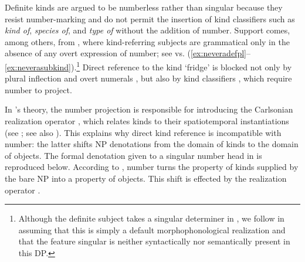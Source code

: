 \documentclass[output=paper]{langscibook}
\begin{document}
Definite kinds are argued to be numberless rather than singular because they resist number-marking and do not permit the insertion of kind classifiers such as \textit{kind of}, \textit{species of}, and \textit{type of} without the addition of number. Support comes, among others, from , where kind-referring subjects are grammatical only in the absence of any overt expression of number; see  vs. (\ref{ex:neveradefpl}--\ref{ex:neverasubkind}).\footnote{Although the definite subject takes a singular determiner in , we follow \citeauthor{Borik.Espinal2012} in assuming that this is simply a default morphophonological realization and that the feature singular is neither syntactically nor semantically present in this DP.}
Direct reference to the kind `fridge' is blocked not only by plural inflection and overt numerals , but also by kind classifiers , which require number to project.

\ea \label{ex:nevera}
\label{ex:neveradefsg}


\z \z

\noindent
In \citeauthor{Borik.Espinal2012}'s theory, the number projection is responsible for introducing the Carlsonian realization operator , which relates kinds to their spatiotemporal instantiations (see ; see also \citealt{Carlson1977}). This explains why direct kind reference is incompatible with number: the latter shifts NP denotations from the domain of kinds to the domain of objects. The formal denotation given to a singular number head in \citet{Borik.Espinal2015} is reproduced below. According to , number turns the property of kinds supplied by the bare NP into a property of objects. This shift is effected by the realization operator .
\end{document}
